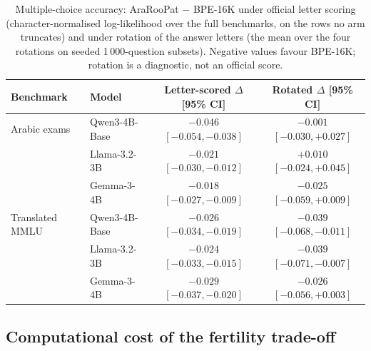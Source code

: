 \documentclass[a4paper,fleqn]{cas-sc}
\begin{document}
\begin{table}[t]
\centering
\caption{Multiple-choice accuracy: AraRooPat $-$ BPE-16K under official letter scoring (character-normalised log-likelihood over the full benchmarks, on the rows no arm truncates) and under rotation of the answer letters (the mean over the four rotations on seeded 1\,000-question subsets). Negative values favour BPE-16K; rotation is a diagnostic, not an official score.}
\label{tab:mcq}
\begin{tabular}{@{}llcc@{}}
\toprule
Benchmark & Model & Letter-scored $\Delta$ [95\% CI] & Rotated $\Delta$ [95\% CI] \\
\midrule
Arabic exams & Qwen3-4B-Base & $-0.046$ $[-0.054,-0.038]$ & $-0.001$ $[-0.030,+0.027]$ \\
 & Llama-3.2-3B & $-0.021$ $[-0.030,-0.012]$ & $+0.010$ $[-0.024,+0.045]$ \\
 & Gemma-3-4B & $-0.018$ $[-0.027,-0.009]$ & $-0.025$ $[-0.059,+0.009]$ \\
\midrule
Translated MMLU & Qwen3-4B-Base & $-0.026$ $[-0.034,-0.019]$ & $-0.039$ $[-0.068,-0.011]$ \\
 & Llama-3.2-3B & $-0.024$ $[-0.033,-0.015]$ & $-0.039$ $[-0.071,-0.007]$ \\
 & Gemma-3-4B & $-0.029$ $[-0.037,-0.020]$ & $-0.026$ $[-0.056,+0.003]$ \\
\bottomrule
\end{tabular}
\end{table}

\subsection{Computational cost of the fertility trade-off}
\label{sec:results:cost}
\end{document}
